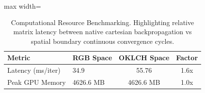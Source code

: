 \begin{table}[htbp]
\centering
\small
\caption{Computational Resource Benchmarking. Highlighting relative matrix latency between native cartesian backpropagation vs spatial boundary continuous convergence cycles.}
\label{tab:computational_overhead}
\begin{adjustbox}{max width=\linewidth}
\begin{tabular}{@{}llcc@{}}
\toprule
\textbf{Metric} & \textbf{RGB Space} & \textbf{OKLCH Space} & \textbf{Factor} \\ \midrule
Latency (ms/iter) & 34.9 & 55.76 & 1.6x \\
Peak GPU Memory & 4626.6 MB & 4626.6 MB & 1.0x \\
\bottomrule
\end{tabular}
\end{adjustbox}
\end{table}
